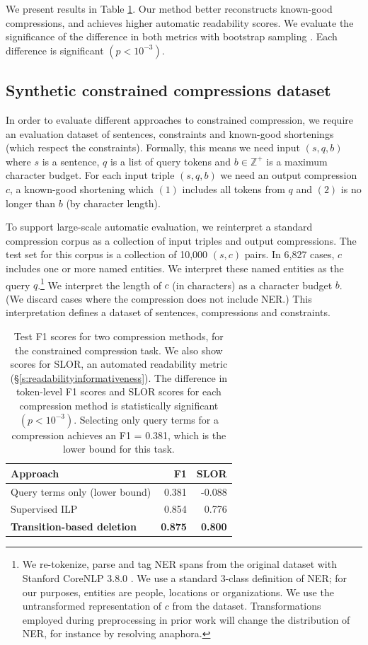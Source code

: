 \documentclass[11pt,a4paper]{article}
\begin{document}
We present results in Table \ref{t:results}. Our method better reconstructs known-good compressions, and achieves higher automatic readability scores. We evaluate the significance of the difference in both metrics with bootstrap sampling \cite{D12-1091}. Each difference is significant {\small $(p < 10^{-3})$}. 

\subsection{Synthetic constrained compressions dataset}

In order to evaluate different approaches to constrained compression, we require an evaluation dataset of sentences, constraints and known-good shortenings (which respect the constraints). Formally, this means we need input $(s, q, b)$ where $s$ is a sentence, $q$ is a list of query tokens and $b \in \mathbb{Z}^{+}$ is a maximum character budget. For each input triple $(s,q,b)$ we need an output compression $c$, a known-good shortening which $(1)$ includes all tokens from $q$ and $(2)$ is no longer than $b$ (by character length). 

To support large-scale automatic evaluation, we reinterpret a standard compression corpus \cite{filippova2013overcoming} as a collection of input triples and output compressions. The test set for this corpus is a collection of 10,000 $(s,c)$ pairs. In 6,827 cases, $c$ includes one or more named entities. We interpret these named entities as the query $q$.\footnote{We re-tokenize, parse and tag NER spans from the original dataset with Stanford CoreNLP 3.8.0 \cite{corenlp}. We use a standard 3-class definition of NER; for our purposes, entities are people, locations or organizations. We use the untransformed representation of $c$ from the dataset. Transformations employed during preprocessing in prior work \cite{filippova2013overcoming} will change the distribution of NER, for instance by resolving anaphora.} We interpret the length of $c$ (in characters) as a character budget $b$. (We discard cases where the compression does not include NER.) This interpretation defines a dataset of sentences, compressions and constraints.

\begin{table}[]
\begin{tabular}{lrr}
\centering
Approach & F1 & SLOR  \\ \hline
Query terms only {\small (lower bound)} & 0.381 & -0.088 \\
Supervised ILP  &  0.854   &  0.776       \\
\textbf{Transition-based deletion} &  \textbf{0.875}  & \textbf{0.800}   \\
\end{tabular}
\caption{Test F1 scores for two compression methods, for the constrained compression task. We also show scores for SLOR, an automated readability metric (\S\ref{s:readabilityinformativeness}). The difference in token-level F1 scores and SLOR scores for each compression method is statistically significant {\small $(p < 10^{-3})$}. Selecting only query terms for a compression achieves an F1 = 0.381, which is the lower bound for this task.}
\label{t:results}
\end{table}
\end{document}
